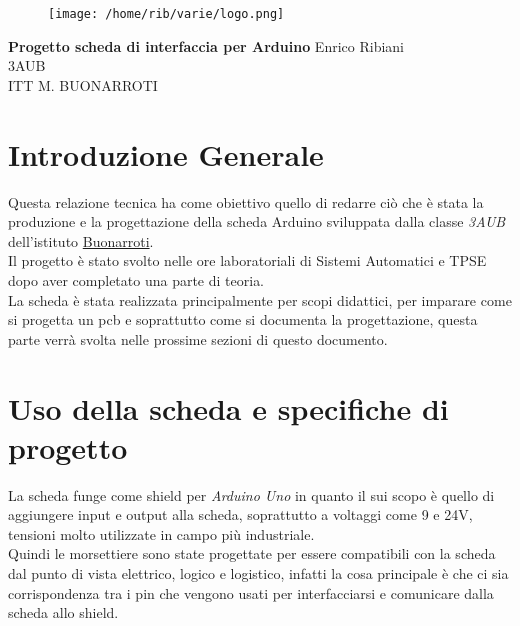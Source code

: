 \documentclass{article}
\begin{document}
    \begin{titlepage}
\begin{flushleft}
\begin{figure}[h]
    \centering
    \texttt{[image: /home/rib/varie/logo.png]}
\end{figure}
\vspace{2\baselineskip}
\Huge{\textbf{Progetto scheda di interfaccia per Arduino}}
\vfill
\LARGE Enrico Ribiani\\
\LARGE 3AUB\\
\vfill
\huge{ITT M. BUONARROTI }

\end{flushleft}
\end{titlepage}
\pagestyle{fancy}
\fancyhead{}
\cfoot{\thepage}
\tableofcontents
{}
\vskip 3cm
\section{Introduzione Generale}
Questa relazione tecnica ha come obiettivo quello di redarre ciò che è stata la produzione e la progettazione della scheda 
Arduino sviluppata dalla classe \textit{3AUB} dell'istituto \href{https://www.buonarroti.tn.it/}{Buonarroti}.\\
Il progetto è stato svolto nelle ore laboratoriali di Sistemi Automatici e TPSE dopo aver completato una parte di teoria.\\
La scheda è stata realizzata principalmente per scopi didattici, per imparare come si progetta un pcb e soprattutto come si documenta la progettazione, questa parte verrà svolta
nelle prossime sezioni di questo documento.\\
\section{Uso della scheda e specifiche di progetto}
La scheda funge come shield per \textit{Arduino Uno} in quanto il sui scopo è quello di aggiungere input e output alla scheda, soprattutto 
a voltaggi come 9 e 24V, tensioni molto utilizzate in campo più industriale.\\
Quindi le morsettiere sono state progettate per essere compatibili con la scheda dal punto di vista elettrico, logico e logistico, infatti la cosa principale è che 
ci sia corrispondenza tra i pin che vengono usati per interfacciarsi e comunicare dalla scheda allo shield.
\end{document}
